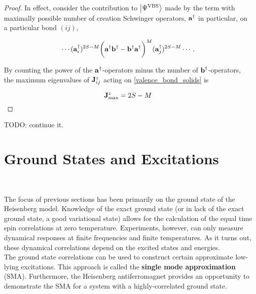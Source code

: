 \documentclass{homework}
\begin{document}
\begin{proof}

In effect, consider the contribution to $\ket{\Psi^{\textnormal{VBS}}}$ made by the term with maximally possible number of creation Schwinger operators, ${\bf a}^\dagger$ in particular, on a particular bond $(ij)$,

\begin{equation}
    \cdots ({\bf a}_i^\dagger)^{2S-M} \bigg({\bf a}^\dagger {\bf b}^\dagger - {\bf b}^\dagger {\bf a}^\dagger \bigg)^{M} ({\bf a}_j^\dagger)^{2S-M}\cdots.
\end{equation}

By counting the power of the ${\bf a}^\dagger$-operators minus the number of ${\bf b}^\dagger$-operators, the maximum eigenvalues of ${\bf J}_{ij}^z$ acting on \cref{valence_bond_solids}
is 

\begin{equation}
    {\bf J}^z_{\textnormal{max}} = 2S-M
\end{equation}

\end{proof}

TODO: continue it. 

\clearpage

\section{\textbf{Ground States and Excitations}}

\blanky \\

\begin{tcolorbox}[colback =yellow, title = Physical Context]

The focus of previous sections has  been primarily on the ground state of the Heisenberg model. Knowledge of the exact ground state (or in lack of the exact ground state, a good variational state) allows for the calculation of the equal time spin correlations at zero temperature. Experiments, however, can only measure dynamical responses at finite frequencies and finite temperatures. As it turns out, these dynamical correlations depend on the excited states and energies. \\

The ground state correlations can be used to construct certain approximate low-lying excitations. This approach is called the \textbf{single mode approximation} (SMA). Furthermore, the Heisenberg antiferromagnet provides an opportunity to demonstrate the SMA for a system with a highly-correlated ground state. 

\end{tcolorbox}
\end{document}
